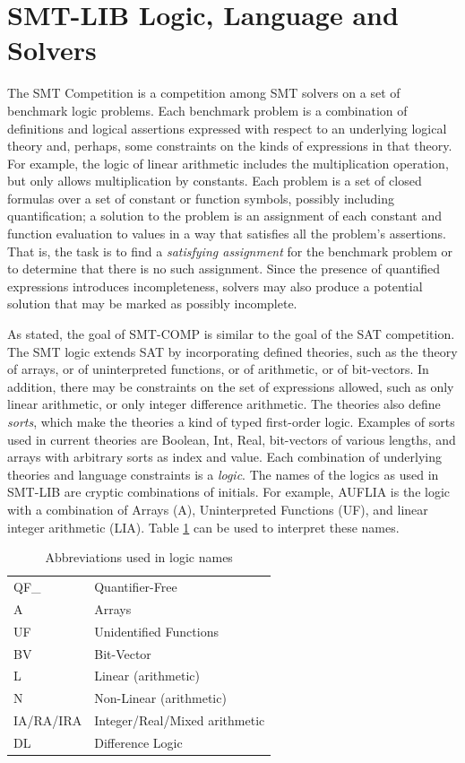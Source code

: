 \documentclass[twoside,11pt]{article}
\begin{document}
\section{SMT-LIB Logic, Language and Solvers}
\label{sec:context}

The SMT Competition is a competition among SMT solvers on a set of benchmark logic problems. Each benchmark problem is a combination of definitions and logical assertions expressed with respect to an underlying logical theory and, perhaps, some constraints on the kinds of expressions in that theory. For example,  the logic of linear arithmetic includes the multiplication operation, but only allows multiplication by constants. Each problem is a set of closed formulas over a set of constant or function symbols, possibly including quantification; a solution to the problem is an assignment of each constant and function evaluation to values in a way that satisfies all the problem's assertions. That is, the task is to find a \emph{satisfying assignment} for the benchmark problem or to determine that there is no such assignment. Since the presence of quantified expressions introduces incompleteness, solvers may also produce a potential solution that may be marked as possibly incomplete.

As stated, the goal of SMT-COMP is similar to the goal of the SAT competition. The SMT logic extends SAT by incorporating defined theories, such as the theory of arrays, or of uninterpreted functions, or of arithmetic, or of bit-vectors. In addition, there may be constraints on the set of expressions allowed, such as only linear arithmetic, or only integer difference arithmetic. The theories also define \emph{sorts}, which make the theories a kind of typed first-order logic. Examples of sorts used in current theories are Boolean, Int, Real, bit-vectors of various lengths, and arrays with arbitrary sorts as index and value. Each combination of underlying theories and language constraints is a \emph{logic}.
The names of the logics as used in SMT-LIB are cryptic combinations of initials. For example, AUFLIA is the logic with a
combination of Arrays (A), Uninterpreted Functions (UF), and linear integer arithmetic (LIA). Table \ref{logicAbbreviations} can be used to interpret these names.
\begin{table}
\begin{center}
\begin{tabular}{|l|l|}
\hline
QF\_ & Quantifier-Free \\
A & Arrays \\
UF & Unidentified Functions \\
BV & Bit-Vector \\
L & Linear (arithmetic) \\
N & Non-Linear (arithmetic) \\
IA/RA/IRA & Integer/Real/Mixed arithmetic \\
DL & Difference Logic \\
\hline
\end{tabular}
\end{center}
\caption{Abbreviations used in logic names}
\label{logicAbbreviations}
\end{table}
\end{document}
